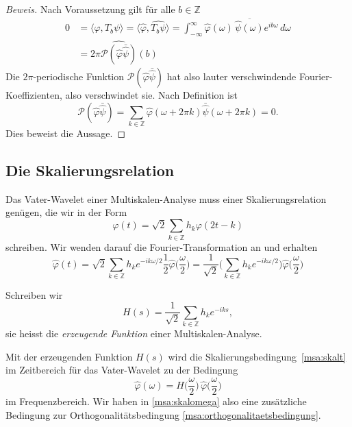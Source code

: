 \begin{proof}[Beweis]
Nach Voraussetzung gilt für alle $b\in\mathbb Z$
\begin{align*}
0
&=
\langle \varphi,T_b\psi\rangle
=
\langle \hat{\varphi}, \widehat{T_b\psi}\rangle
=
\int_{-\infty}^\infty
\hat{\varphi}(\omega)\, \overline{\hat{\psi}(\omega)} e^{ib\omega}
\,d\omega
\\
&=
2\pi
\widehat{\mathcal{P}(\hat{\varphi}\bar{\hat{\psi}})}(b)
\end{align*}
Die $2\pi$-periodische Funktion $\mathcal{P}(\hat{\varphi}\bar{\hat{\psi}})$ 
hat also lauter verschwindende Fourier-Koeffizienten, also verschwindet
sie.
Nach Definition ist
\[
\mathcal{P}(\hat{\varphi}\bar{\hat{\psi}})
=
\sum_{k\in\mathbb Z}
\hat{\varphi}(\omega + 2\pi k)
\bar{\hat{\psi}}(\omega + 2\pi k)
=0.
\]
Dies beweist die Aussage.
\end{proof}

%
%
\subsection{Die Skalierungsrelation}
Das Vater-Wavelet einer Multiskalen-Analyse muss einer Skalierungsrelation
genügen, die wir in der Form
\begin{equation}
\varphi(t)
=
\sqrt{2} \sum_{k\in\mathbb Z} h_k \varphi(2t-k)
\label{msa:skalt}
\end{equation}
schreiben.
Wir wenden darauf die Fourier-Transformation an und erhalten
\[
\hat{\varphi}(t)
=
\sqrt{2} \sum_{k\in\mathbb Z} h_k e^{-ik\omega/2} \frac12\hat{\varphi}\biggl(\frac{\omega}{2}\biggr)
=
\frac1{\sqrt{2}}
\biggl(\sum_{k\in\mathbb Z}h_ke^{-ik\omega/2}\biggr)
\hat{\varphi}\biggl(\frac{\omega}2\biggr)
\]

\begin{definition}
\label{definition:erzeugende-funktion-msa}
Schreiben wir 
\[
H(s)
=
\frac1{\sqrt{2}}
\sum_{k\in\mathbb Z}h_ke^{-iks},
\]
sie heisst die {\em erzeugende Funktion} einer Multiskalen-Analyse.
\end{definition}

Mit der erzeugenden Funktion $H(s)$ wird die
Skalierungsbedingung~\eqref{msa:skalt} im Zeitbereich
für das Vater-Wavelet zu der Bedingung
\begin{equation}
\hat{\varphi}(\omega) 
=
H\biggl(\frac{\omega}2\biggr)\,\hat{\varphi}\biggl(\frac{\omega}2\biggr)
\label{msa:skalomega}
\end{equation}
im Frequenzbereich.
Wir haben in \eqref{msa:skalomega}
also eine zusätzliche Bedingung zur Orthogonalitätsbedingung
\eqref{msa:orthogonalitaetsbedingung}.

